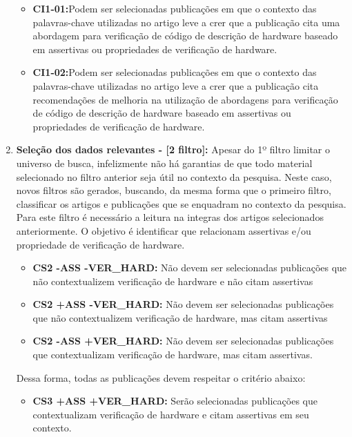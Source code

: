 \begin{enumerate}
	\begin{itemize}
	\item \textbf{CI1-01:}Podem ser selecionadas publicações em que o contexto das palavras-chave utilizadas no artigo leve a crer que a publicação cita uma abordagem para verificação de código de descrição de hardware baseado em assertivas ou propriedades de verificação de hardware.
	\item \textbf{CI1-02:}Podem ser selecionadas publicações em que o contexto das palavras-chave utilizadas no artigo leve a crer que a publicação cita recomendações de melhoria na utilização de abordagens para verificação de código de descrição de hardware baseado em assertivas ou propriedades de verificação de hardware.
	\end{itemize}
	
\item \textbf{Seleção dos dados relevantes - [2 filtro]:} Apesar do 1º filtro limitar o universo de busca, infelizmente não há garantias de que todo material selecionado no filtro anterior seja útil no contexto da pesquisa. Neste caso, novos filtros são gerados, buscando, da mesma forma que o primeiro filtro, classificar os artigos e publicações que se enquadram no contexto da pesquisa. Para este filtro é necessário a leitura na integras dos artigos selecionados anteriormente. O objetivo é identificar que relacionam assertivas e/ou propriedade de verificação de hardware.
    \begin{itemize}
    \item \textbf{CS2 -ASS -VER\_HARD:} Não devem ser selecionadas publicações que não contextualizem verificação de hardware e não citam assertivas
    \item \textbf{CS2 +ASS -VER\_HARD:} Não devem ser selecionadas publicações que não contextualizem verificação de hardware, mas citam assertivas
    \item \textbf{CS2 -ASS +VER\_HARD:} Não devem ser selecionadas publicações que contextualizam verificação de hardware, mas citam assertivas.
    \end{itemize}
Dessa forma, todas as publicações devem respeitar o critério abaixo:
	\begin{itemize}
	\item \textbf{CS3 +ASS +VER\_HARD:} Serão selecionadas publicações que contextualizam verificação de hardware e citam assertivas em seu contexto.
	\end{itemize}     	
\end{enumerate}

